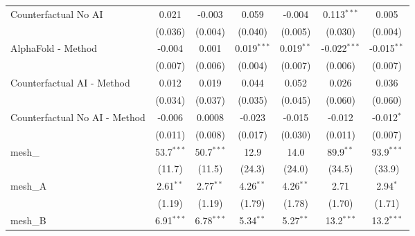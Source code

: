 \begin{tabular}{lcccccc}
   Counterfactual No AI                                        & 0.021          & -0.003         & 0.059         & -0.004        & 0.113$^{***}$  & 0.005\\   
                                                               & (0.036)        & (0.004)        & (0.040)       & (0.005)       & (0.030)        & (0.004)\\   
   AlphaFold - Method                                          & -0.004         & 0.001          & 0.019$^{***}$ & 0.019$^{**}$  & -0.022$^{***}$ & -0.015$^{**}$\\   
                                                               & (0.007)        & (0.006)        & (0.004)       & (0.007)       & (0.006)        & (0.007)\\   
   Counterfactual AI - Method                                  & 0.012          & 0.019          & 0.044         & 0.052         & 0.026          & 0.036\\   
                                                               & (0.034)        & (0.037)        & (0.035)       & (0.045)       & (0.060)        & (0.060)\\   
   Counterfactual No AI - Method                               & -0.006         & 0.0008         & -0.023        & -0.015        & -0.012         & -0.012$^{*}$\\   
                                                               & (0.011)        & (0.008)        & (0.017)       & (0.030)       & (0.011)        & (0.007)\\   
   mesh\_                                                      & 53.7$^{***}$   & 50.7$^{***}$   & 12.9          & 14.0          & 89.9$^{**}$    & 93.9$^{***}$\\   
                                                               & (11.7)         & (11.5)         & (24.3)        & (24.0)        & (34.5)         & (33.9)\\   
   mesh\_A                                                     & 2.61$^{**}$    & 2.77$^{**}$    & 4.26$^{**}$   & 4.26$^{**}$   & 2.71           & 2.94$^{*}$\\   
                                                               & (1.19)         & (1.19)         & (1.79)        & (1.78)        & (1.70)         & (1.71)\\   
   mesh\_B                                                     & 6.91$^{***}$   & 6.78$^{***}$   & 5.34$^{**}$   & 5.27$^{**}$   & 13.2$^{***}$   & 13.2$^{***}$\\   

\end{tabular}
